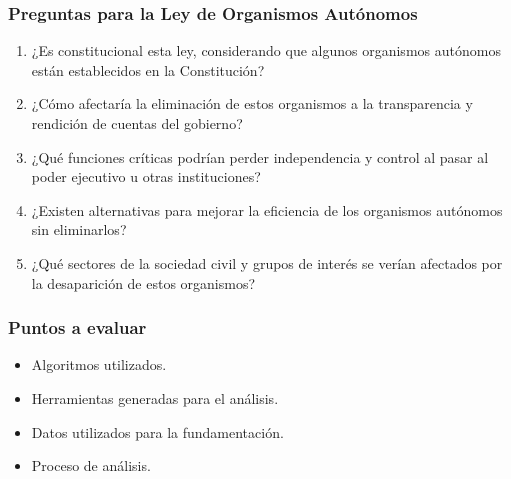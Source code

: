 \documentclass[11pt]{article}
\begin{document}
\subsubsection*{Preguntas para la Ley de Organismos Autónomos}
\label{sec:orgb242f28}
\begin{enumerate}
\item ¿Es constitucional esta ley, considerando que algunos organismos autónomos están establecidos en la Constitución?
\item ¿Cómo afectaría la eliminación de estos organismos a la transparencia y rendición de cuentas del gobierno?
\item ¿Qué funciones críticas podrían perder independencia y control al pasar al poder ejecutivo u otras instituciones?
\item ¿Existen alternativas para mejorar la eficiencia de los organismos autónomos sin eliminarlos?
\item ¿Qué sectores de la sociedad civil y grupos de interés se verían afectados por la desaparición de estos organismos?
\end{enumerate}

\subsubsection*{Puntos a evaluar}
\label{sec:orgf0e3274}
\begin{itemize}
\item Algoritmos utilizados.
\item Herramientas generadas para el análisis.
\item Datos utilizados para la fundamentación.
\item Proceso de análisis.
\end{itemize}
\end{document}
